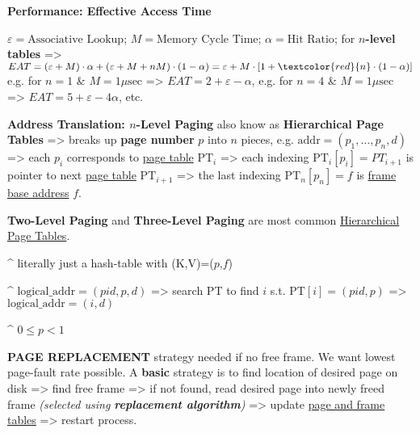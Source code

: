\textbf{Performance: Effective Access Time}
\begin{enumerate}
    \vItem $\varepsilon = \textrm{Associative Lookup}$; $M = \textrm{Memory Cycle Time}$; $\alpha = \textrm{Hit Ratio}$;
    for \textbf{$n$-level tables} => \(EAT = (\varepsilon + M) \cdot \alpha + (\varepsilon + M + nM) \cdot (1-\alpha) 
    = \varepsilon + M\cdot \left[1 + \textcolor{red}{n}\cdot(1-\alpha) \right]\)
    \vItem e.g. for $n=1$ \& $M = 1 \mu \mathrm{sec}$ => \(EAT = 2 + \varepsilon - \alpha\),
    \vItem e.g. for $n=4$ \& $M = 1 \mu \mathrm{sec}$ => \(EAT = 5 + \varepsilon - 4\alpha\), etc.
\end{enumerate}

\hSep

\textbf{Address Translation: $n$-Level Paging} also know as \textbf{Hierarchical Page Tables} =>
breaks up \textbf{page number} $p$ into $n$ pieces, e.g. \textcolor{cornellred}{$\mathrm{addr}=(p_1,\dots,p_n,d)$} =>
each $p_i$ corresponds to \ul{page table} $\mathrm{PT}_i$ =>
each indexing \textcolor{cornellred}{$\mathrm{PT}_i[p_i] = PT_{i+1}$} is pointer to next \ul{page table} $\mathrm{PT}_{i+1}$
=> the last indexing \textcolor{cornellred}{$\mathrm{PT}_n[p_n] = f$} is \ul{frame base address} $f$.

\textbf{Two-Level Paging} and \textbf{Three-Level Paging} are most common \ul{Hierarchical Page Tables}. 

\hSep

\^{} literally just a hash-table with (K,V)=($p$,$f$)

\^{} $\mathrm{logical\_addr} = (pid,p,d)$ => search PT to find $i$ s.t. \textcolor{cornellred}{$\mathrm{PT}[i] = (pid,p)$}
=> $\mathrm{logical\_addr} = (i,d)$

\hSep


\hSep

\^{} $0 \leq p < 1$

\hSep

\textbf{PAGE REPLACEMENT} strategy needed if no free frame. We want lowest page-fault rate possible.
A \textbf{basic} strategy is to find location of desired page on disk => find free frame =>
if not found, read desired page into newly freed frame \textit{(selected using \textbf{replacement algorithm})} =>
update \ul{page and frame tables} => restart process.


